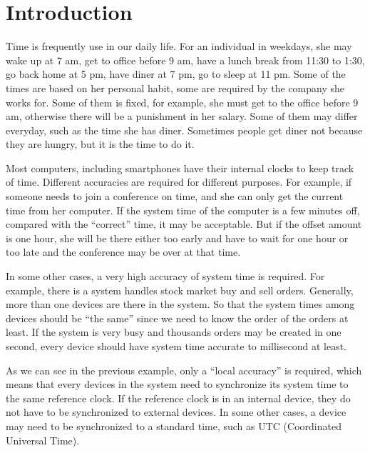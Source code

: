 


\chapter{Introduction}
Time is frequently use in our daily life. 
For an individual in weekdays, she may wake up at 7 am, get to office before 9
am, have a lunch break from 11:30 to 1:30, go back home at 5 pm, have diner at
7 pm, go to sleep at 11 pm. Some of the times are based on her personal habit,
some are required by the company she works for. Some of them is fixed, for
example, she must get to the office before 9 am, otherwise there will be a
punishment in her salary.  Some of them may differ everyday, such as the time
she has diner. Sometimes people get diner not because they are hungry, but it
is the time to do it.

Most computers, including smartphones have their internal clocks to keep track
of time. Different accuracies are required for different purposes. 
For example, if someone needs to join a conference on time, and she can
only get the current time from her computer. If the system time of the
computer is a few minutes off, compared with the ``correct'' time, it may be
acceptable. But if the offset amount is one hour, she will be there either too
early and have to wait for one hour or too late and the conference may be over
at that time.

In some other cases, a very high accuracy of system time is required. For
example, there is a system handles stock market buy and sell orders. Generally,
more than one devices are there in the system. So that the system times among
devices should be ``the same'' since we need to know the order of the orders at
least. If the system is very busy and thousands orders may be created in one
second, every device should have system time accurate to millisecond at least.

As we can see in the previous example, only a ``local accuracy'' is required,
which means that every devices in the system need to synchronize its system
time to the same reference clock. If the reference clock is in an internal
device, they do not have to be synchronized to external devices. In some other
cases, a device may need to be synchronized to a standard time, such as UTC
(Coordinated Universal Time).  

